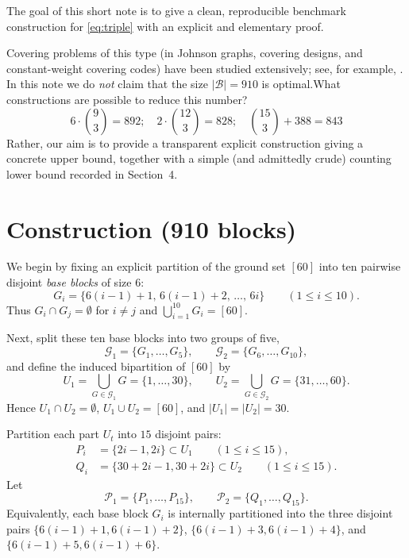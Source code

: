 \documentclass[11pt]{article}
\begin{document}
The goal of this short note is to give a clean, reproducible benchmark construction for \eqref{eq:triple}
with an explicit and elementary proof.

Covering problems of this type (in Johnson graphs, covering designs, and constant-weight covering codes)
have been studied extensively; see, for example, \cite{ColbournDinitz,CohenEtAl,Brouwer}.
In this note we do \emph{not} claim that the size $|\mathcal{B}|=910$ is optimal.What constructions are possible to reduce this number?
\[
6 \cdot \binom{9}{3} = 892; \quad 2 \cdot \binom{12}{3} = 828; \quad \binom{15}{3} + 388 = 843
\]
Rather, our aim is to provide a transparent explicit construction giving a concrete upper bound,
together with a simple (and admittedly crude) counting lower bound recorded in Section~4.


\section{Construction (910 blocks)}
\label{sec:construction}

We begin by fixing an explicit partition of the ground set $[60]$ into ten pairwise disjoint
\emph{base blocks} of size $6$:
\[
G_i=\{6(i-1)+1,\,6(i-1)+2,\,\dots,\,6i\}\qquad (1\le i\le 10).
\]
Thus $G_i\cap G_j=\emptyset$ for $i\neq j$ and $\bigcup_{i=1}^{10}G_i=[60]$.

Next, split these ten base blocks into two groups of five,
\[
\mathcal{G}_1=\{G_1,\dots,G_5\},\qquad \mathcal{G}_2=\{G_6,\dots,G_{10}\},
\]
and define the induced bipartition of $[60]$ by
\begin{equation}\label{eq:halves}
U_1=\bigcup_{G\in\mathcal{G}_1}G=\{1,\dots,30\},\qquad
U_2=\bigcup_{G\in\mathcal{G}_2}G=\{31,\dots,60\}.
\end{equation}
Hence $U_1\cap U_2=\emptyset$, $U_1\cup U_2=[60]$, and $|U_1|=|U_2|=30$.

Partition each part $U_t$ into $15$ disjoint pairs:
\begin{align*}
P_i&=\{2i-1,2i\}\subset U_1\qquad (1\le i\le 15),\\
Q_i&=\{30+2i-1,30+2i\}\subset U_2\qquad (1\le i\le 15).
\end{align*}
Let
\[
\mathcal{P}_1=\{P_1,\dots,P_{15}\},\qquad
\mathcal{P}_2=\{Q_1,\dots,Q_{15}\}.
\]
Equivalently, each base block $G_i$ is internally partitioned into the three disjoint pairs
$\{6(i-1)+1,6(i-1)+2\}$, $\{6(i-1)+3,6(i-1)+4\}$, and $\{6(i-1)+5,6(i-1)+6\}$.
\end{document}
